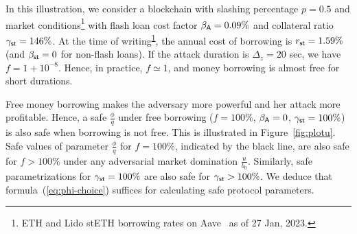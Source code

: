 In this illustration,
we consider a blockchain with slashing percentage
$p = 0.5$ and market conditions\footnote{\label{footnote:aave}ETH and Lido stETH borrowing rates
on Aave~\cite{aave} as of 27 Jan, 2023.}
with \asset flash loan cost factor $\beta_{\textsf{A}} = 0.09\%$ and
collateral ratio $\gamma_{\textsf{st}} = 146\%$.
At the time of writing\textsuperscript{\ref{footnote:aave}}, the annual cost of borrowing \stasset
is $r_{\textsf{st}} = 1.59\%$ (and $\beta_{\textsf{st}} = 0$ for non-flash loans).
If the attack duration is $\Delta_z = 20$ sec, we have
 $f = 1 + 10^{-8}$.
Hence, in practice, $f \simeq 1$, and money borrowing is almost free
for short durations.

Free money borrowing makes the adversary more powerful
and her attack more profitable.
Hence, a safe $\frac{\phi}{q}$ under free
borrowing ($f = 100\%$, $\beta_{\textsf{A}} = 0$, $\gamma_{\textsf{st}} = 100\%$)
is also safe when borrowing is not free.
This is illustrated in
Figure~\ref{fig:plotu}. Safe values of parameter $\frac{\phi}{q}$
for $f = 100\%$, indicated by the black line, are also safe for $f > 100\%$
under any adversarial market domination $\frac{u}{b_0}$.
Similarly, safe parametrizations for $\gamma_{\textsf{st}} = 100\%$ are also safe
for $\gamma_{\textsf{st}} > 100\%$.
We deduce that formula~(\ref{eq:phi-choice}) suffices for calculating
safe protocol parameters.

